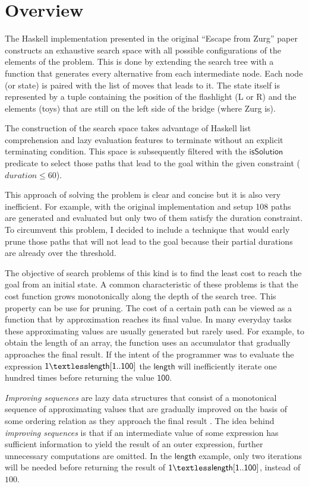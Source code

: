 \documentclass[journal,onecolumn,12pt]{IEEEtran}
\begin{document}
\section{Overview}
The Haskell implementation presented in the original ``Escape from Zurg'' paper \cite{erwing} constructs 
an exhaustive search space with all possible configurations of the elements of the problem.  This is done by extending the search tree with a function that generates every alternative from each intermediate node.  Each node (or state) is paired with the list of moves that leads to it. The state itself is represented by a tuple containing the position of the flashlight (\textsc{L} or \textsc{R}) and the elements (toys) that are still on the left side of the bridge (where Zurg is). 

The construction of the search space takes advantage of Haskell list comprehension and lazy evaluation features to terminate without an explicit terminating condition.  This space is subsequently filtered with the $\mathsf{isSolution}$ predicate to select those paths that lead to the goal within the given constraint (\textsc{$duration \le 60$}). 

This approach of solving the problem is clear and concise but it is also very inefficient.  For example, with the original implementation and setup 108 paths are generated and evaluated but only two of them satisfy the duration constraint. To circumvent this problem, I decided to include a technique that would early prune those paths that will not lead to the goal because their partial durations are already over the threshold. 

The objective of search problems of this kind is to find the least cost to reach the goal from an initial state.  A common characteristic of these problems is that the cost function grows monotonically along the depth of the search tree. This property can be use for pruning.  The cost of a certain path can be viewed as a function that by approximation reaches its final value. In many everyday tasks these approximating values are usually generated but rarely used.  For example, to obtain the length of an array, the function uses an accumulator that gradually approaches the final result.  If the intent of the programmer was to evaluate the expression $\mathsf{1 \textless length [1..100]}$ the $\mathsf{length}$ will inefficiently iterate one hundred times before returning the value $\mathsf{100}$.

\textit{Improving sequences} are lazy data structures that consist of a monotonical sequence of approximating values that are gradually improved on the basis of some ordering relation as they approach the final result \cite{iwasaki}.   The idea behind \textit{improving sequences} is that if an intermediate value of some expression has sufficient information to yield the result of an outer expression, further unnecessary computations are omitted.  In the $\mathsf{length}$ example, only two iterations will be needed before returning the result of $\mathsf{1 \textless length [1..100]}$, instead of $100$.
\end{document}
